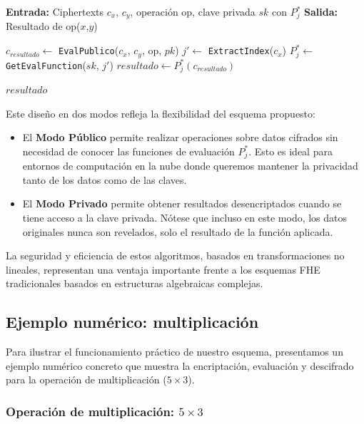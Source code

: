 \documentclass[11pt]{article}
\theoremstyle{plain}
\begin{document}
\begin{algorithm}
\caption{Evaluación en Modo Privado (con $P^*_j$)}
\begin{algorithmic}[1]
    \State \textbf{Entrada:} Ciphertexts $c_x$, $c_y$, operación op, clave privada $sk$ con $P^*_j$
    \State \textbf{Salida:} Resultado de op($x$,$y$)
    
    \State $c_{resultado} \gets$ \texttt{EvalPublico}($c_x$, $c_y$, op, $pk$)
    \State $j' \gets$ \texttt{ExtractIndex}($c_x$) 
    \State $P^*_j \gets$ \texttt{GetEvalFunction}($sk$, $j'$)
    \State $resultado \gets P^*_j(c_{resultado})$
    
    \State \Return $resultado$
\EndProcedure
\end{algorithmic}
\end{algorithm}

Este diseño en dos modos refleja la flexibilidad del esquema propuesto:

\begin{itemize}
    \item El \textbf{Modo Público} permite realizar operaciones sobre datos cifrados sin necesidad de conocer las funciones de evaluación $P^*_j$. Esto es ideal para entornos de computación en la nube donde queremos mantener la privacidad tanto de los datos como de las claves.
    
    \item El \textbf{Modo Privado} permite obtener resultados desencriptados cuando se tiene acceso a la clave privada. Nótese que incluso en este modo, los datos originales nunca son revelados, solo el resultado de la función aplicada.
\end{itemize}

La seguridad y eficiencia de estos algoritmos, basados en transformaciones no lineales, representan una ventaja importante frente a los esquemas FHE tradicionales basados en estructuras algebraicas complejas.

\subsection{Ejemplo numérico: multiplicación}

Para ilustrar el funcionamiento práctico de nuestro esquema, presentamos un ejemplo numérico concreto que muestra la encriptación, evaluación y descifrado para la operación de multiplicación ($5 \times 3$).

\subsubsection{Operación de multiplicación: $5 \times 3$}
\end{document}
